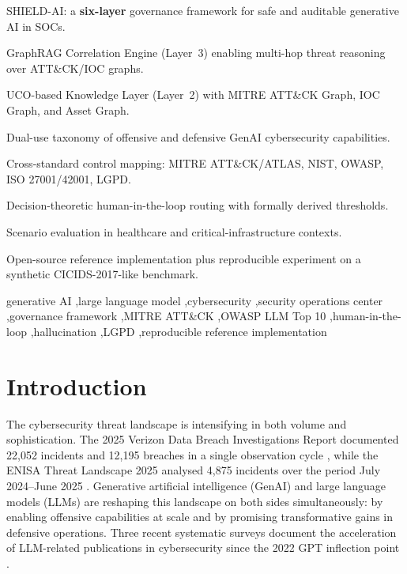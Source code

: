 \documentclass[preprint,12pt,authoryear]{elsarticle}
\begin{document}
\begin{frontmatter}
\begin{highlights}
\item SHIELD-AI: a \textbf{six-layer} governance framework for safe and auditable generative AI in SOCs.
\item GraphRAG Correlation Engine (Layer~3) enabling multi-hop threat reasoning over ATT\&CK/IOC graphs.
\item UCO-based Knowledge Layer (Layer~2) with MITRE ATT\&CK Graph, IOC Graph, and Asset Graph.
\item Dual-use taxonomy of offensive and defensive GenAI cybersecurity capabilities.
\item Cross-standard control mapping: MITRE ATT\&CK/ATLAS, NIST, OWASP, ISO 27001/42001, LGPD.
\item Decision-theoretic human-in-the-loop routing with formally derived thresholds.
\item Scenario evaluation in healthcare and critical-infrastructure contexts.
\item Open-source reference implementation plus reproducible experiment on a synthetic CICIDS-2017-like benchmark.
\end{highlights}

\begin{keyword}
generative AI \sep large language model \sep cybersecurity \sep security operations center \sep governance framework \sep MITRE ATT\&CK \sep OWASP LLM Top 10 \sep human-in-the-loop \sep hallucination \sep LGPD \sep reproducible reference implementation
\end{keyword}

\end{frontmatter}

\section{Introduction}
\label{sec:intro}

The cybersecurity threat landscape is intensifying in both volume and sophistication. The 2025 Verizon Data Breach Investigations Report documented 22{,}052 incidents and 12{,}195 breaches in a single observation cycle \citep{dbir2025}, while the ENISA Threat Landscape 2025 analysed 4{,}875 incidents over the period July 2024--June 2025 \citep{enisa2025}. Generative artificial intelligence (GenAI) and large language models (LLMs) are reshaping this landscape on both sides simultaneously: by enabling offensive capabilities at scale and by promising transformative gains in defensive operations. Three recent systematic surveys document the acceleration of LLM-related publications in cybersecurity since the 2022 GPT inflection point \citep{llmsurvey2024,contextualizedai2024,redblue2025}.
\end{document}
